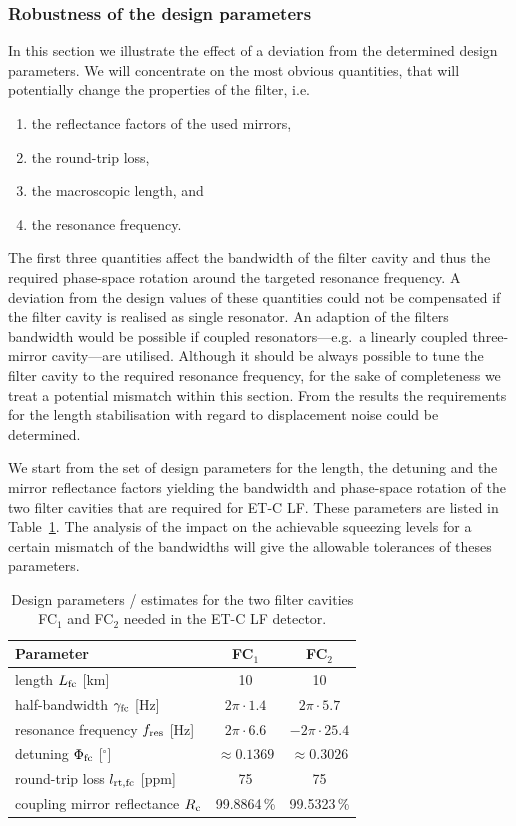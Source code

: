 \FloatBarrier
\subsubsection{Robustness of the design parameters}\label{app:robustparam}
In this section we illustrate the effect of a deviation from the determined design parameters. We will concentrate on the most obvious quantities, that will potentially  change the properties of the filter, i.e.\

\begin{enumerate}
\item{the reflectance factors of the used mirrors, }
\item{the round-trip loss,}
\item{the macroscopic length, and}
\item{the resonance frequency.}
\end{enumerate}
The first three quantities affect the bandwidth of the filter cavity and thus the required phase-space rotation around the targeted resonance frequency. A deviation from the design values of these quantities could not be compensated if the filter cavity is realised as  single resonator. An adaption of the filters bandwidth would be possible if coupled resonators---e.g.\ a linearly coupled three-mirror cavity---are utilised.  Although it should be always possible to tune the filter cavity to the required resonance frequency, for the sake of completeness we treat a potential  mismatch within this section. From the results the requirements for the length stabilisation with regard to displacement noise could be determined.

We start from the set of design parameters for the length, the detuning and the mirror reflectance factors yielding the bandwidth and phase-space rotation of the two filter cavities that are required for ET-C LF. These parameters are listed  in Table~\ref{tab:designparams}. The analysis of the impact on the achievable squeezing levels for a certain mismatch of the bandwidths will give the allowable tolerances of theses parameters.
\begin{table}[h]
\begin{center}
\begin{tabular}{lcc}
\hline
\hline
Parameter & FC$_1$ & FC$_2$\\
\hline
length $L_{\rm fc}$ [km] & 10 & 10\\
half-bandwidth $\gamma_{\rm fc}$ [Hz] & $2\pi\cdot1.4$ & $2\pi\cdot5.7$\\
resonance frequency  $f_{\rm res}$ [Hz] &  $2\pi\cdot6.6$ & $-2\pi\cdot25.4$\\
detuning $\Phi_{\rm fc}$ [$^\circ$] & $\approx 0.1369$ & $\approx 0.3026$\\
round-trip loss $l_{\rm rt,fc}$  [ppm] &75  & 75\\
coupling mirror reflectance $R_{\rm c}$ & 99.8864\,\% & 99.5323\,\%\\
\hline
\hline
\end{tabular}
\end{center}
\caption{Design parameters / estimates for the two filter cavities FC$_1$ and FC$_2$ needed in the ET-C LF detector.}
\label{tab:designparams}
\end{table}


